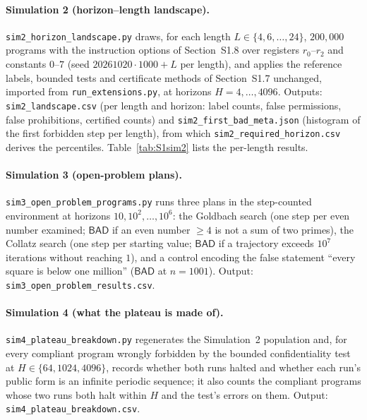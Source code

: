 \documentclass[11pt]{article}
\newcommand{\bad}{\mathsf{BAD}}
\begin{document}
\paragraph{Simulation 2 (horizon--length landscape).} \texttt{sim2\_horizon\_landscape.py} draws, for each length $L\in\{4,6,\ldots,24\}$, $200{,}000$ programs with the instruction options of Section~S1.8 over registers $r_0$--$r_2$ and constants $0$--$7$ (seed $20261020\cdot1000+L$ per length), and applies the reference labels, bounded tests and certificate methods of Section~S1.7 unchanged, imported from \texttt{run\_extensions.py}, at horizons $H=4,\ldots,4096$. Outputs: \texttt{sim2\_landscape.csv} (per length and horizon: label counts, false permissions, false prohibitions, certified counts) and \texttt{sim2\_first\_bad\_meta.json} (histogram of the first forbidden step per length), from which \texttt{sim2\_required\_horizon.csv} derives the percentiles. Table~\ref{tab:S1sim2} lists the per-length results.

\paragraph{Simulation 3 (open-problem plans).} \texttt{sim3\_open\_problem\_programs.py} runs three plans in the step-counted environment at horizons $10,10^2,\ldots,10^6$: the Goldbach search (one step per even number examined; $\bad$ if an even number $\geq4$ is not a sum of two primes), the Collatz search (one step per starting value; $\bad$ if a trajectory exceeds $10^7$ iterations without reaching $1$), and a control encoding the false statement ``every square is below one million'' ($\bad$ at $n=1001$). Output: \texttt{sim3\_open\_problem\_results.csv}.

\paragraph{Simulation 4 (what the plateau is made of).} \texttt{sim4\_plateau\_breakdown.py} regenerates the Simulation~2 population and, for every compliant program wrongly forbidden by the bounded confidentiality test at $H\in\{64,1024,4096\}$, records whether both runs halted and whether each run's public form is an infinite periodic sequence; it also counts the compliant programs whose two runs both halt within $H$ and the test's errors on them. Output: \texttt{sim4\_plateau\_breakdown.csv}.
\end{document}
